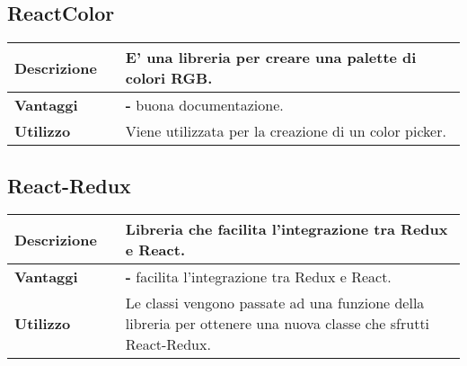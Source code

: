 \vspace{40px}
\subsection{ReactColor}
\label{ReactColor}
\begin{table}[H]
	\centering
	\begin{tabular}{p{2cm}p{0.5cm}p{11.5cm}}
		\arrayrulecolor{lightgray}
		\toprule
		\textbf{Descrizione} & &
		E' una libreria \js{} per creare una palette di colori RGB.
		\\ \midrule
		\textbf{Vantaggi} & &
		\textbf{- }buona documentazione.
		\\ \midrule
		\textbf{Utilizzo} & &
		Viene  utilizzata per la creazione di un color picker.
		\\ \bottomrule
	\end{tabular}
\end{table}



\vspace{40px}
\subsection{React-Redux}
\label{React-Redux}
\begin{table}[H]
	\centering
	\begin{tabular}{p{2cm}p{0.5cm}p{11.5cm}}
		\arrayrulecolor{lightgray}
		\toprule
		\textbf{Descrizione} & &
		Libreria che facilita l'integrazione tra Redux e React.
		\\ \midrule
		\textbf{Vantaggi} & &
		\textbf{- }facilita l'integrazione tra Redux e React.
		\\ \midrule
		\textbf{Utilizzo} & &
		Le classi \js{} vengono passate ad una funzione della libreria per ottenere una nuova classe che sfrutti React-Redux.
		\\ \bottomrule
	\end{tabular}
\end{table}



\vspace{40px}
